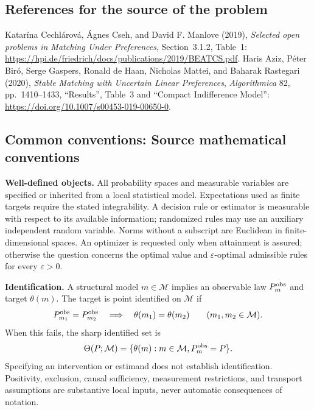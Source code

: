 \documentclass[11pt,a4paper]{article}
\begin{document}
\subsection*{References for the source of the problem}
Katar\'ina Cechl\'arov\'a, \'Agnes Cseh, and David F. Manlove (2019), \emph{Selected open problems in Matching Under Preferences}, Section~3.1.2, Table~1: \url{https://hpi.de/friedrich/docs/publications/2019/BEATCS.pdf}. Haris Aziz, P\'eter Bir\'o, Serge Gaspers, Ronald de Haan, Nicholas Mattei, and Baharak Rastegari (2020), \emph{Stable Matching with Uncertain Linear Preferences}, \emph{Algorithmica} 82, pp.~1410--1433, ``Results'', Table~3 and ``Compact Indifference Model'': \url{https://doi.org/10.1007/s00453-019-00650-0}.

\subsection*{Common conventions: Source mathematical conventions}

\textbf{Well-defined objects.}
All probability spaces and measurable variables are specified or inherited
from a local statistical model. Expectations used as finite targets require
the stated integrability. A decision rule or estimator is measurable with
respect to its available information; randomized rules may use an auxiliary
independent random variable. Norms without a subscript are Euclidean in
finite-dimensional spaces. An optimizer is requested only when attainment
is assured; otherwise the question concerns the optimal value and
$\varepsilon$-optimal admissible rules for every $\varepsilon>0$.

\textbf{Identification.}
A structural model $m\in\mathcal M$ implies an observable law
$P_m^{\rm obs}$ and target $\theta(m)$. The target is point identified on
$\mathcal M$ if
\[
 P_{m_1}^{\rm obs}=P_{m_2}^{\rm obs}
 \quad\Longrightarrow\quad\theta(m_1)=\theta(m_2)
 \qquad(m_1,m_2\in\mathcal M).
\]
When this fails, the sharp identified set is
\[
 \Theta(P;\mathcal M)=\{\theta(m):m\in\mathcal M,
                                  P_m^{\rm obs}=P\}.
\]
Specifying an intervention or estimand does not establish identification.
Positivity, exclusion, causal sufficiency, measurement restrictions, and
transport assumptions are substantive local inputs, never automatic
consequences of notation.
\end{document}
